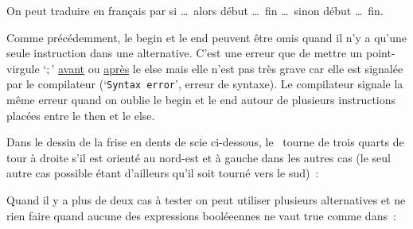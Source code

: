 On peut traduire en français par {\idt si} \ldots\ {\idt alors} {\idt début}  \ldots\ {\idt fin}
 \ldots\ {\idt sinon} {\idt début}  \ldots\ {\idt fin}.

Comme précédemment, le {\mcl begin} et le {\mcl end} peuvent être omis quand il n'y a qu'une
seule instruction dans une alternative.
C'est une erreur que de mettre un point-virgule `{\idt $;$}' \underline{avant} ou 
\underline{après} le {\mcl else} mais elle n'est pas
très grave car elle est signalée par le com\-pi\-la\-teur (`{\tt Syntax error}', erreur de syntaxe).
Le compilateur signale la même erreur quand on oublie le {\mcl begin} et le {\mcl end} 
autour de plusieurs instructions placées entre le {\mcl then} et le {\mcl else}.

Dans le dessin de la frise en dents de scie ci-dessous, le \robot\ tourne de trois quarts de tour à droite 
s'il est orienté au nord-est et à gauche dans les autres cas (le seul autre cas possible étant d'ailleurs
qu'il soit tourné vers le sud)~:

\vspace{0.4cm}
 {\raggedright 
 
 }
 \vfill
 Quand il y a plus de deux cas à tester on peut utiliser plusieurs alternatives et ne rien faire
 quand aucune des expressions booléeennes ne vaut {\idt true} comme dans~:
 
